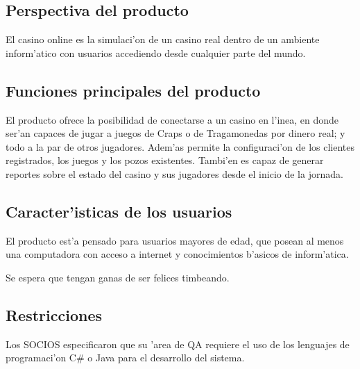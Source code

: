  \subsection{ Perspectiva del producto	}
El casino online es la simulaci'on de un casino real dentro de un ambiente inform'atico con usuarios accediendo desde cualquier parte del mundo.

 \subsection{ Funciones principales del producto }
El producto ofrece la posibilidad de conectarse a un casino en l'inea, en donde ser'an capaces de jugar a juegos de Craps o de Tragamonedas por dinero real; y todo a la par de otros jugadores. Adem'as permite la configuraci'on de los clientes registrados, los juegos y los pozos existentes. Tambi'en es capaz de generar reportes sobre el estado del casino y sus jugadores desde el inicio de la jornada.

 \subsection{ Caracter'isticas de los usuarios }
El producto est'a pensado para usuarios mayores de edad, que posean al menos una computadora con acceso a internet y conocimientos b'asicos de inform'atica.

Se espera que tengan ganas de ser felices timbeando.

 \subsection{ Restricciones }
Los SOCIOS especificaron que su 'area de QA requiere el uso de los lenguajes de programaci'on C\# o Java para el desarrollo del sistema.

